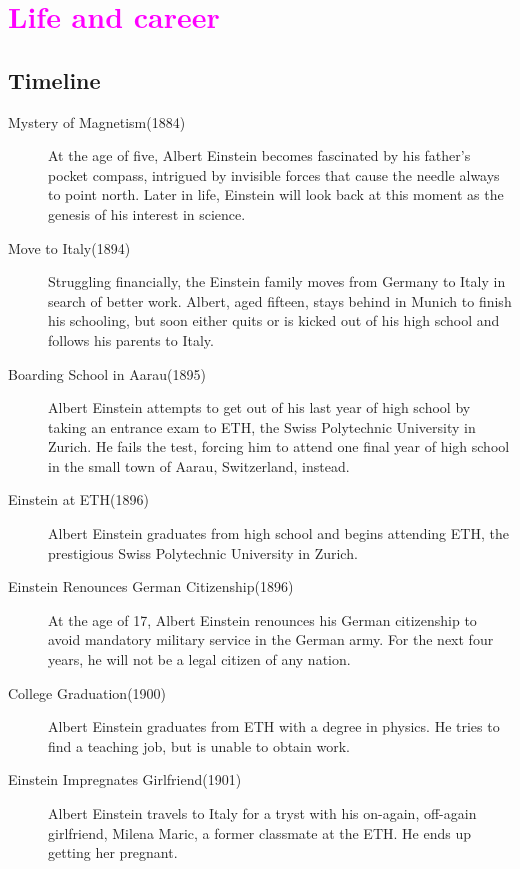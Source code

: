 \documentclass{article}
\begin{document}
\section{\textcolor{magenta}{Life and career}}

\subsection{Timeline}
\begin{description}

\item[Mystery of Magnetism(1884)]
At the age of five, Albert Einstein becomes fascinated by his father's pocket compass, intrigued by invisible forces that cause the needle always to point north. Later in life, Einstein will look back at this moment as the genesis of his interest in science.

\item[Move to Italy(1894)]
Struggling financially, the Einstein family moves from Germany to Italy in search of better work. Albert, aged fifteen, stays behind in Munich to finish his schooling, but soon either quits or is kicked out of his high school and follows his parents to Italy.

\item[Boarding School in Aarau(1895)]
Albert Einstein attempts to get out of his last year of high school by taking an entrance exam to ETH, the Swiss Polytechnic University in Zurich. He fails the test, forcing him to attend one final year of high school in the small town of Aarau, Switzerland, instead.

\item[Einstein at ETH(1896)]
Albert Einstein graduates from high school and begins attending ETH, the prestigious Swiss Polytechnic University in Zurich.

\item[Einstein Renounces German Citizenship(1896)]
At the age of 17, Albert Einstein renounces his German citizenship to avoid mandatory military service in the German army. For the next four years, he will not be a legal citizen of any nation.

\item[College Graduation(1900)]
Albert Einstein graduates from ETH with a degree in physics. He tries to find a teaching job, but is unable to obtain work.

\item[Einstein Impregnates Girlfriend(1901)]
Albert Einstein travels to Italy for a tryst with his on-again, off-again girlfriend, Milena Maric, a former classmate at the ETH. He ends up getting her pregnant.


\end{description}
\end{document}
